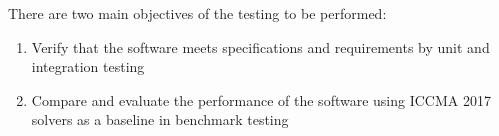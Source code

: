 There are two main objectives of the testing to be performed:
\begin{enumerate}
	\item{Verify that the software meets specifications and requirements by unit and integration testing}
	\item{Compare and evaluate the performance of the software using ICCMA 2017 solvers as a baseline in benchmark testing}
\end{enumerate}
